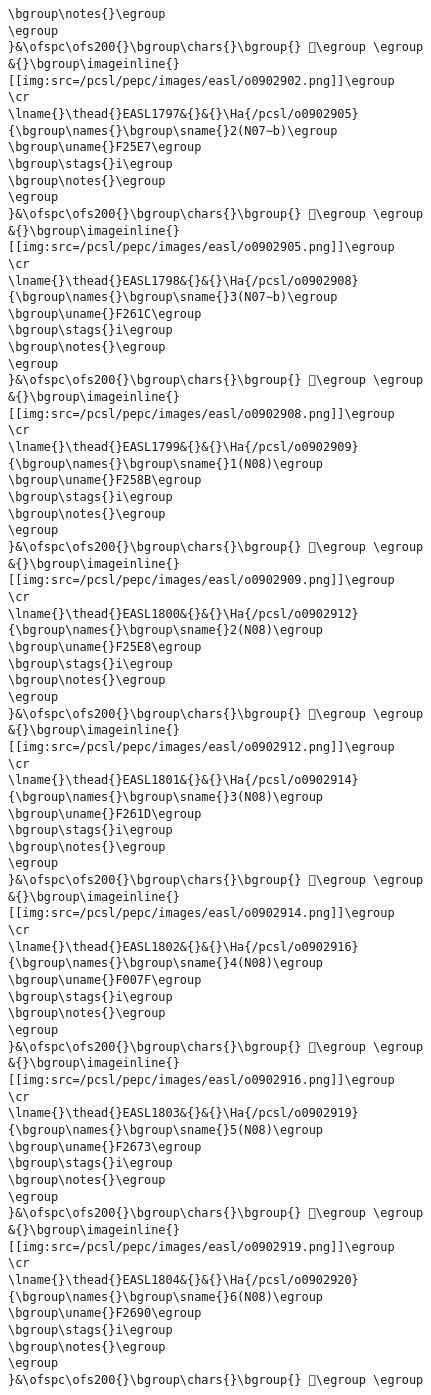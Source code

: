 \begin{verbatim}
\bgroup\notes{}\egroup
\egroup
}&\ofspc\ofs200{}\bgroup\chars{}\bgroup{} 󲖊\egroup \egroup
&{}\bgroup\imageinline{}[[img:src=/pcsl/pepc/images/easl/o0902902.png]]\egroup
\cr
\lname{}\thead{}EASL1797&{}&{}\Ha{/pcsl/o0902905}{\bgroup\names{}\bgroup\sname{}2(N07∼b)\egroup
\bgroup\uname{}F25E7\egroup
\bgroup\stags{}i\egroup
\bgroup\notes{}\egroup
\egroup
}&\ofspc\ofs200{}\bgroup\chars{}\bgroup{} 󲗧\egroup \egroup
&{}\bgroup\imageinline{}[[img:src=/pcsl/pepc/images/easl/o0902905.png]]\egroup
\cr
\lname{}\thead{}EASL1798&{}&{}\Ha{/pcsl/o0902908}{\bgroup\names{}\bgroup\sname{}3(N07∼b)\egroup
\bgroup\uname{}F261C\egroup
\bgroup\stags{}i\egroup
\bgroup\notes{}\egroup
\egroup
}&\ofspc\ofs200{}\bgroup\chars{}\bgroup{} 󲘜\egroup \egroup
&{}\bgroup\imageinline{}[[img:src=/pcsl/pepc/images/easl/o0902908.png]]\egroup
\cr
\lname{}\thead{}EASL1799&{}&{}\Ha{/pcsl/o0902909}{\bgroup\names{}\bgroup\sname{}1(N08)\egroup
\bgroup\uname{}F258B\egroup
\bgroup\stags{}i\egroup
\bgroup\notes{}\egroup
\egroup
}&\ofspc\ofs200{}\bgroup\chars{}\bgroup{} 󲖋\egroup \egroup
&{}\bgroup\imageinline{}[[img:src=/pcsl/pepc/images/easl/o0902909.png]]\egroup
\cr
\lname{}\thead{}EASL1800&{}&{}\Ha{/pcsl/o0902912}{\bgroup\names{}\bgroup\sname{}2(N08)\egroup
\bgroup\uname{}F25E8\egroup
\bgroup\stags{}i\egroup
\bgroup\notes{}\egroup
\egroup
}&\ofspc\ofs200{}\bgroup\chars{}\bgroup{} 󲗨\egroup \egroup
&{}\bgroup\imageinline{}[[img:src=/pcsl/pepc/images/easl/o0902912.png]]\egroup
\cr
\lname{}\thead{}EASL1801&{}&{}\Ha{/pcsl/o0902914}{\bgroup\names{}\bgroup\sname{}3(N08)\egroup
\bgroup\uname{}F261D\egroup
\bgroup\stags{}i\egroup
\bgroup\notes{}\egroup
\egroup
}&\ofspc\ofs200{}\bgroup\chars{}\bgroup{} 󲘝\egroup \egroup
&{}\bgroup\imageinline{}[[img:src=/pcsl/pepc/images/easl/o0902914.png]]\egroup
\cr
\lname{}\thead{}EASL1802&{}&{}\Ha{/pcsl/o0902916}{\bgroup\names{}\bgroup\sname{}4(N08)\egroup
\bgroup\uname{}F007F\egroup
\bgroup\stags{}i\egroup
\bgroup\notes{}\egroup
\egroup
}&\ofspc\ofs200{}\bgroup\chars{}\bgroup{} 󰁿\egroup \egroup
&{}\bgroup\imageinline{}[[img:src=/pcsl/pepc/images/easl/o0902916.png]]\egroup
\cr
\lname{}\thead{}EASL1803&{}&{}\Ha{/pcsl/o0902919}{\bgroup\names{}\bgroup\sname{}5(N08)\egroup
\bgroup\uname{}F2673\egroup
\bgroup\stags{}i\egroup
\bgroup\notes{}\egroup
\egroup
}&\ofspc\ofs200{}\bgroup\chars{}\bgroup{} 󲙳\egroup \egroup
&{}\bgroup\imageinline{}[[img:src=/pcsl/pepc/images/easl/o0902919.png]]\egroup
\cr
\lname{}\thead{}EASL1804&{}&{}\Ha{/pcsl/o0902920}{\bgroup\names{}\bgroup\sname{}6(N08)\egroup
\bgroup\uname{}F2690\egroup
\bgroup\stags{}i\egroup
\bgroup\notes{}\egroup
\egroup
}&\ofspc\ofs200{}\bgroup\chars{}\bgroup{} 󲚐\egroup \egroup

\end{verbatim}

